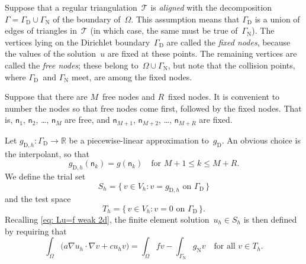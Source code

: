Suppose that a regular triangulation~$\mathcal{T}$ is \emph{aligned} with 
the decomposition $\Gamma=\Gamma_{\mathrm{D}}\cup\Gamma_{\mathrm{N}}$ of the 
boundary of~$\Omega$.  This assumption means that $\Gamma_{\mathrm{D}}$ 
is a union of edges of triangles in~$\mathcal{T}$ (in which 
case, the same must be true of~$\Gamma_{\mathrm{N}}$).  The vertices lying on 
the Dirichlet boundary~$\Gamma_{\mathrm{D}}$ are called the \emph{fixed nodes}, 
because the values of the solution~$u$ are fixed at these points.  The 
remaining vertices are called the \emph{free nodes}; these belong 
to~$\Omega\cup\Gamma_{\mathrm{N}}$, but note that the collision points, where
$\Gamma_{\mathrm{D}}$~and $\Gamma_{\mathrm{N}}$ meet, are among the fixed nodes.

Suppose that there are $M$~free nodes and $R$~fixed nodes. It is convenient to 
number the nodes so that free nodes come first, followed by the fixed nodes.
That is, $\mathsf{n}_1$, $\mathsf{n}_2$, \dots, 
$\mathsf{n}_M$ are free, and $\mathsf{n}_{M+1}$, $\mathsf{n}_{M+2}$, \dots, 
$\mathsf{n}_{M+R}$ are fixed.  

Let $g_{\mathrm{D},h}:\Gamma_{\mathrm{D}}\to\mathbb{R}$ be a piecewise-linear 
approximation to~$g_{\mathrm{D}}$.  An obvious choice is the interpolant, so
that
\[
g_{\mathrm{D},h}(\mathsf{n}_k)=g(\mathsf{n}_k)\quad\text{for $M+1\le k\le M+R$.}
\]
We define the trial set
\[
S_h=\{\,v\in V_h:\text{$v=g_{\mathrm{D},h}$ on $\Gamma_{\mathrm{D}}$}\,\}
\]
and the test space
\[
T_h=\{\,v\in V_h:\text{$v=0$ on $\Gamma_{\mathrm{D}}$}\,\}.
\]
Recalling \eqref{eq: Lu=f weak 2d}, the finite element 
solution~$u_h\in S_h$ is then defined by requiring that
\begin{equation}\label{eq: FEM 2d}
\int_\Omega\bigl(a\nabla u_h\cdot\nabla v+cu_hv\bigr)=\int_\Omega fv
	-\int_{\Gamma_{\mathrm{N}}}g_{\mathrm{N}}v
	\quad\text{for all $v\in T_h$.}
\end{equation}

